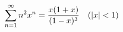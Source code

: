 \documentclass[preview]{standalone}
\begin{document}
\begin{align*}
\special{dvisvgm:raw <g id='unique000'>}\sum_{n=1}^{\infty}n^2x^n=\dfrac{x(1+x)}{(1-x)^3}\quad(|x|<1)\special{dvisvgm:raw </g>}
\end{align*}
\end{document}
